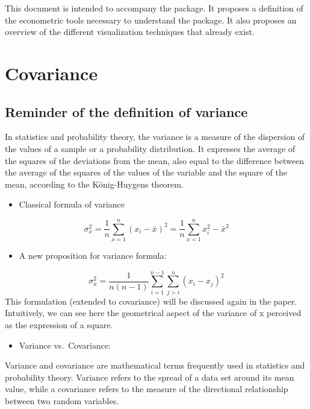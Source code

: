 \documentclass[
]{report}
\providecommand{\tightlist}{%
  \setlength{\itemsep}{0pt}\setlength{\parskip}{0pt}}
\begin{document}
This document is intended to accompany the package. It proposes a definition of the econometric tools necessary to understand the package. It also proposes an overview of the different visualization techniques that already exist.

\hypertarget{covariance}{%
\chapter{Covariance}\label{covariance}}

\hypertarget{reminder-of-the-definition-of-variance}{%
\section{Reminder of the definition of variance}\label{reminder-of-the-definition-of-variance}}

In statistics and probability theory, the variance is a measure of the dispersion of the values of a sample or a probability distribution. It expresses the average of the squares of the deviations from the mean, also equal to the difference between the average of the squares of the values of the variable and the square of the mean, according to the König-Huygens theorem.

\begin{itemize}
\tightlist
\item
  Classical formula of variance
\end{itemize}

\[\sigma^2_x=\frac{1}{n}\sum_{x=1}^{n}(x_i - \bar{x})^2 = \frac{1}{n}\sum_{x=1}^{n}x_i^2 - \bar{x}^2\]

\begin{itemize}
\tightlist
\item
  A new proposition for variance formula\citep{Heffernan}:
\end{itemize}

\[\sigma^2_x= \frac{1}{n(n-1)}\sum_{i=1}^{n-1}\sum_{j>i}^{n}(x_i-x_j)^2\]
This formulation (extended to covariance) will be discussed again in the paper. Intuitively, we can see here the geometrical aspect of the variance of x perceived as the expression of a square.

\begin{itemize}
\tightlist
\item
  Variance vs.~Covariance:
\end{itemize}

Variance and covariance are mathematical terms frequently used in statistics and probability theory. Variance refers to the spread of a data set around its mean value, while a covariance refers to the measure of the directional relationship between two random variables.
\end{document}
